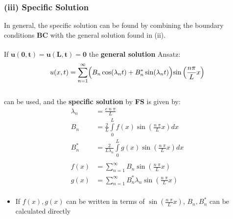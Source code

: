 \subsubsection{(iii) Specific Solution}
In general, the specific solution can be found by combining the boundary conditions \textbf{BC} 
with the general solution found in (ii).\\\hbox{}\\
If $\mathbf{u(0,t)=u(L,t)= 0}$ the \textbf{general solution} Ansatz:
\begin{equation*}
    u(x,t)=\sum\limits_{n=1}^{\infty}
    \Bigr( B_n \cos(\lambda _n t)+B_n^* \sin(\lambda_n t)\Bigl) \sin 
    \left(\frac{n \pi}{L}x \right)
\end{equation*}\\
can be used, and the \textbf{specific solution} by \textbf{FS} is given by:
\begin{align*}
    \lambda_n&=\frac{c\; n\; \pi}{L}\\
    B_n&=\frac{2}{L}\int\limits_0^L f(x)\sin(\frac{n\;\pi}{L}x)dx\\
    B_n^*&=\frac{2}{L\lambda_n} \int\limits_0^L g(x) \sin(\frac{n\;\pi}{L}x)dx\\\\
    f(x)&=\sum\limits_{n=1}^{\infty} B_n \sin(\frac{n\;\pi}{L}x)\\
    g(x)&=\sum\limits_{n=1}^{\infty} B_n^* \lambda_n \sin(\frac{n\;\pi}{L}x)\\
\end{align*}
\begin{itemize}
    \item If $f(x),g(x)$ can be written in terms of $\sin(\frac{n\;\pi}{L}x)$, $B_n, B_n^*$ 
    can be calculated directly
\end{itemize}
%
%
